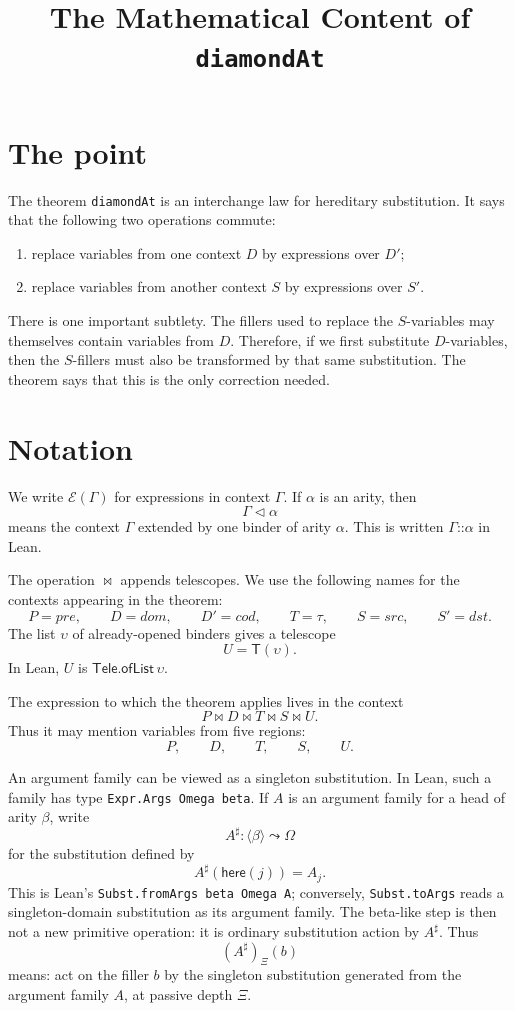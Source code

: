 \documentclass[11pt]{article}
\title{The Mathematical Content of \texttt{diamondAt}}
\author{}
\date{}
\newcommand{\E}{\mathcal E}
\newcommand{\Tel}{\mathsf{T}}
\newcommand{\ext}{\mathbin{\triangleleft}}
\begin{document}
\maketitle

\section*{The point}

The theorem \texttt{diamondAt} is an interchange law for hereditary
substitution.  It says that the following two operations commute:

\begin{enumerate}
\item replace variables from one context \(D\) by expressions over \(D'\);
\item replace variables from another context \(S\) by expressions over \(S'\).
\end{enumerate}

There is one important subtlety.  The fillers used to replace the \(S\)-variables
may themselves contain variables from \(D\).  Therefore, if we first substitute
\(D\)-variables, then the \(S\)-fillers must also be transformed by that same
substitution.  The theorem says that this is the only correction needed.

\section*{Notation}

We write \(\E(\Gamma)\) for expressions in context \(\Gamma\).  If \(\alpha\) is
an arity, then
\[
  \Gamma \ext \alpha
\]
means the context \(\Gamma\) extended by one binder of arity \(\alpha\).  This is
written \(\Gamma \mathbin{\texttt{::}} \alpha\) in Lean.

The operation \(\bowtie\) appends telescopes.  We use the following names for
the contexts appearing in the theorem:
\[
  P = pre,\qquad
  D = dom,\qquad
  D' = cod,\qquad
  T = \tau,\qquad
  S = src,\qquad
  S' = dst.
\]
The list \(\upsilon\) of already-opened binders gives a telescope
\[
  U = \Tel(\upsilon).
\]
In Lean, \(U\) is \(\mathsf{Tele.ofList}\,\upsilon\).

The expression to which the theorem applies lives in the context
\[
  P \bowtie D \bowtie T \bowtie S \bowtie U.
\]
Thus it may mention variables from five regions:
\[
  P,\qquad D,\qquad T,\qquad S,\qquad U.
\]

An argument family can be viewed as a singleton substitution.  In Lean, such
a family has type \texttt{Expr.Args Omega beta}.  If \(A\) is an argument
family for a head of arity \(\beta\), write
\[
  A^\sharp : \langle\beta\rangle \leadsto \Omega
\]
for the substitution defined by
\[
  A^\sharp(\mathsf{here}(j)) = A_j.
\]
This is Lean's \texttt{Subst.fromArgs beta Omega A}; conversely,
\texttt{Subst.toArgs} reads a singleton-domain substitution as its argument
family.  The beta-like step is then not a new primitive operation: it is
ordinary substitution action by \(A^\sharp\).
Thus
\[
  (A^\sharp)_\Xi(b)
\]
means: act on the filler \(b\) by the singleton substitution generated from the
argument family \(A\), at passive depth \(\Xi\).
\end{document}
